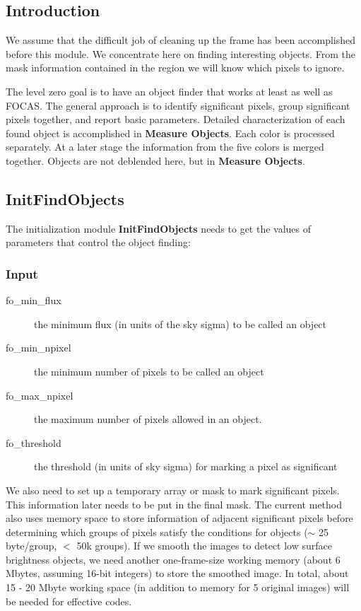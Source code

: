 
\subsection{Introduction}

We assume that the difficult job of cleaning up the frame has been
accomplished before this module.  We concentrate here on finding
interesting objects.  From the mask information contained in the
region we will know which pixels to ignore.

The level zero goal is to have an object finder that works at
least as well as FOCAS. 
The general approach is to identify
significant pixels, group significant pixels together, and
report basic parameters.  Detailed characterization of each
found object is accomplished in {\bf Measure Objects}.
Each color is processed separately.  At a later stage the information from
the five colors is merged together.
Objects are not deblended here, but in {\bf Measure Objects}.
 
\subsection{InitFindObjects}

The initialization module {\bf InitFindObjects} needs to get the values 
of parameters that control the object finding:

\subsubsection {Input}

\begin{description}
 \item[\qquad fo\_min\_flux] the minimum flux (in units of the sky sigma)
         to be called an object
 \item[\qquad fo\_min\_npixel] the minimum number of pixels to be called 
         an object
 \item[\qquad fo\_max\_npixel] the maximum number of pixels allowed in an 
         object.
 \item[\qquad fo\_threshold] the threshold (in units of sky sigma) 
         for marking a pixel as significant
\end{description}

We also need to set up a temporary array or mask to mark significant
pixels.  This information later needs to be put in the final mask.
The current method also uses memory space to store information of adjacent 
significant pixels before determining which groups of pixels satisfy 
the conditions for objects ($\sim$ 25 byte/group, $<$ 50k groups).  
If we smooth the images to detect low surface brightness objects,
we need another one-frame-size working memory (about 6 Mbytes, assuming
16-bit integers) to store the smoothed image. 
In total, about 15 - 20 Mbyte working space (in addition to memory for 5
original images) will be needed for effective codes.

